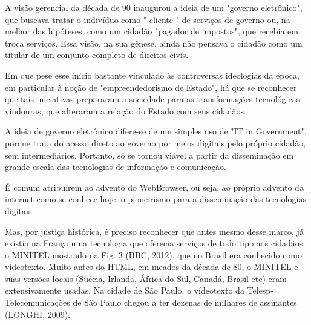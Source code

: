 A visão gerencial da década de 90 inaugurou a ideia de um "governo eletrônico", que buscava tratar o indivíduo como " cliente " de serviços de governo ou, na melhor das hipóteses, como um cidadão "pagador de impostos", que recebia em troca serviços. Essa visão, na sua gênese, ainda não pensava o cidadão como um titular de um conjunto completo de direitos civis.

Em que pese esse início bastante vinculado às controversas ideologias da época, em particular à noção de "empreendedorismo de Estado", há que se reconhecer que tais iniciativas prepararam a sociedade para as transformações tecnológicas vindouras, que alteraram a relação do Estado com seus cidadãos.

A ideia de governo eletrônico difere-se de um simples uso de "IT in Government", porque trata do acesso direto ao governo por meios digitais pelo próprio cidadão, sem intermediários. Portanto, só se tornou viável a partir da disseminação em grande escala das tecnologias de informação e comunicação.

É comum atribuírem ao advento do WebBrowser, ou seja, ao próprio advento da internet como se conhece hoje, o pioneirismo para a disseminação das tecnologias digitais.

Mas, por justiça histórica, é preciso reconhecer que antes mesmo desse marco, já existia na França uma tecnologia que oferecia serviços de todo tipo aos cidadãos: o MINITEL mostrado na Fig. 3 (BBC, 2012), que no Brasil era conhecido como vídeotexto. Muito antes do HTML, em meados da década de 80, o MINITEL e suas versões locais (Suécia, Irlanda, África do Sul, Canadá, Brasil etc) eram extensivamente usadas. Na cidade de São Paulo, o vídeotexto da Telesp- Telecomunicações de São Paulo chegou a ter dezenas de milhares de assinantes (LONGHI, 2009).



